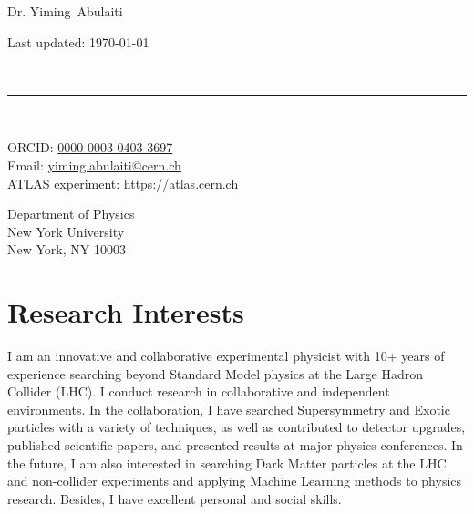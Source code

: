 \documentclass[10pt, a4paper]{article}
\makeatletter
\newcommand{\FirstName}{Yiming}
\newcommand{\LastName}{Abulaiti}
\newcommand{\MyName}{Dr. \FirstName\ \LastName}
\newcommand{\Email}{yiming.abulaiti@cern.ch}
\newcommand{\PersonalWebsite}{www.leouieda.com}
\newcommand{\LabWebsite}{https://atlas.cern.ch}
\newcommand{\ORCID}{0000-0003-0403-3697}
\newcommand{\Address}{
 Department of Physics\\
New York University\\
New York, NY 10003
}
\newcommand{\Website}[1]{\href{https://#1}{#1}}
\makeatother
\begin{document}
\thispagestyle{empty}

\begin{minipage}[t]{0.7\textwidth}
{\fontsize{22pt}{0}\selectfont\MyName}
\end{minipage}
\begin{minipage}[t]{0.3\textwidth}
  \begin{flushright}
    Last updated: \monthyear\today
  \end{flushright}
\end{minipage}
\\[-0.1cm]
\rule{\textwidth}{2pt}
\\[0.1cm]
\begin{minipage}[t]{0.7\textwidth}
    ORCID: \href{https://orcid.org/\ORCID}{\ORCID}
    \\
    Email: \href{mailto:\Email}{\Email}
    \\
    ATLAS experiment: \Website{\LabWebsite}
    \\
\end{minipage}
\begin{minipage}[t]{0.3\textwidth}
  \begin{flushright}
    \Address
  \end{flushright}
\end{minipage}

\section{Research Interests}
I am an innovative and collaborative experimental physicist with 10+ years of 
experience searching beyond Standard Model physics at the Large Hadron Collider 
(LHC). I conduct research in collaborative and independent environments. In the 
collaboration, I have searched Supersymmetry and Exotic particles with a variety 
of techniques, as well as contributed to detector upgrades, published scientific 
papers, and presented results at major physics conferences. In the future, I am 
also interested in searching Dark Matter particles at the LHC and non-collider 
experiments and applying Machine Learning methods to physics research. Besides, 
I  have excellent personal and social skills. 



\end{document}

